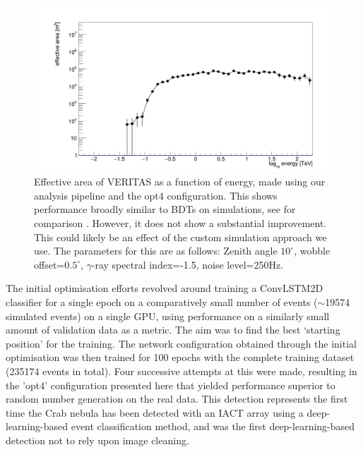 \begin{figure}[] 
        \centering \includegraphics[width=\columnwidth]{figures/EFF.png}

        \caption{
                \label{fig:EFF} Effective area of VERITAS as a function of energy, made using our analysis pipeline and the opt4 configuration. This shows performance broadly similar to BDTs on simulations, see for comparison \cite{vereff}. However, it does not show a substantial improvement. This could likely be an effect of the custom simulation approach we use. The parameters for this are as follows: Zenith angle $10^{\circ}$, wobble offset=$0.5^{\circ}$, $\gamma$-ray spectral index=-1.5, noise level=250Hz. 
        }
\end{figure}
The initial optimisation efforts revolved around training a ConvLSTM2D classifier for a single epoch on a comparatively small number of events ($\sim$19574 simulated events) on a single GPU, using performance on a similarly small amount of validation data as a metric. The aim was to find the best `starting position' for the training. The network configuration obtained through the initial optimisation was then trained for 100 epochs with the complete training dataset (235174 events in total). Four successive attempts at this were made, resulting in the 'opt4' configuration presented here that yielded performance superior to random number generation on the real data. This detection represents the first time the Crab nebula has been detected with an IACT array using a deep-learning-based event classification method, and was the first deep-learning-based detection not to rely upon image cleaning.


\begin{table}[h]
    \centering
    \caption{Anasum output for custom simulations alone run.}
    \label{table:RNG}
\end{table}


